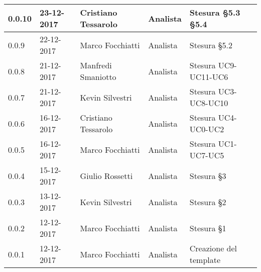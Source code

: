 \documentclass[./AnalisideiRequisiti.tex]{subfiles}
\begin{document}
{\begin{longtable}{|p{20mm}|p{20mm}|p{40mm}|p{30mm}|p{50mm}|}
		0.0.10 & 23-12-2017 & Cristiano Tessarolo & Analista & Stesura §5.3 §5.4\\ \hline		
		0.0.9 & 22-12-2017 & Marco Focchiatti & Analista & Stesura §5.2 \\ \hline		
		0.0.8 & 21-12-2017 & Manfredi Smaniotto & Analista & Stesura UC9-UC11-UC6\\ \hline
		0.0.7 & 21-12-2017 & Kevin Silvestri & Analista & Stesura UC3-UC8-UC10\\ \hline
		0.0.6 & 16-12-2017 & Cristiano Tessarolo & Analista & Stesura UC4-UC0-UC2\\ \hline
		0.0.5 & 16-12-2017 & Marco Focchiatti & Analista & Stesura UC1-UC7-UC5\\ \hline
		0.0.4 & 15-12-2017 & Giulio Rossetti & Analista & Stesura §3\\ \hline
		0.0.3 & 13-12-2017 & Kevin Silvestri & Analista & Stesura §2\\ \hline
		0.0.2 & 12-12-2017 & Marco Focchiatti & Analista & Stesura §1\\ \hline
		0.0.1 & 12-12-2017 & Marco Focchiatti & Analista & Creazione del template\\ \hline
	\end{longtable}

}	
\end{document}
